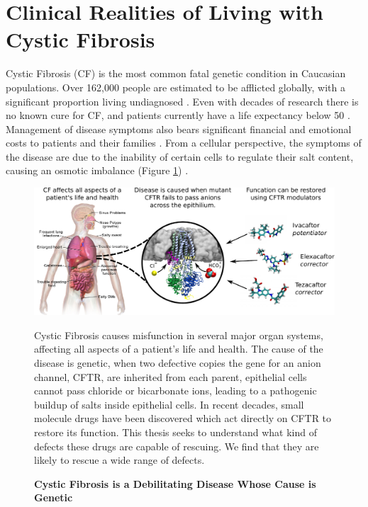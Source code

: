 

\section{Clinical Realities of Living with Cystic Fibrosis}
\label{clinical_realities_CF}
Cystic Fibrosis (CF) is the most common fatal genetic condition in Caucasian populations. Over 162,000 people are estimated to be afflicted globally, with a significant proportion living undiagnosed \cite{hammoudeh2021,guo2022}. Even with decades of research there is no known cure for CF, and patients currently have a life expectancy below 50 \cite{mcbennett2022}. Management of disease symptoms also bears significant financial and emotional costs to patients and their families \cite{vangool2013, page2022}. From a cellular perspective, the symptoms of the disease are due to the inability of certain cells to regulate their salt content, causing an osmotic imbalance (Figure \ref{CF_summary}) \cite{reddy2013}. 

\begin{figure}
	\begin{center}
	\includegraphics[width=1\textwidth]{figures/cf_summary_fig.pdf}
	\end{center}
	\captionsetup{singlelinecheck = false, justification=raggedright}
	\caption[Cystic Fibrosis is a Debilitating Disease Whose Cause is Genetic] {\textbf{Cystic Fibrosis is a Debilitating Disease Whose Cause is Genetic}}{Cystic Fibrosis causes misfunction in several major organ systems, affecting all aspects of a patient's life and health. The cause of the disease is genetic, when two defective copies the gene for an anion channel, CFTR, are inherited from each parent, epithelial cells cannot pass chloride or bicarbonate ions, leading to a pathogenic buildup of salts inside epithelial cells. In recent decades, small molecule drugs have been discovered which act directly on CFTR to restore its function. This thesis seeks to understand what kind of defects these drugs are capable of rescuing. We find that they are likely to rescue a wide range of defects.} 
	\label{CF_summary}
\end{figure}

